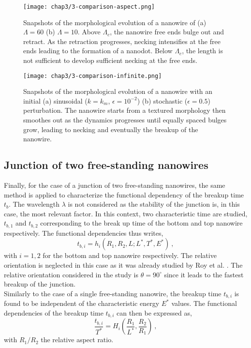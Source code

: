 \begin{figure}[H]
    \centering
    \texttt{[image: chap3/3-comparison-aspect.png]}
    \caption{Snapshots of the morphological evolution of a nanowire of (a) $\Lambda=60$ (b) $\Lambda=10$. Above $\Lambda_c$, the nanowire free ends bulge out and retract. As the retraction progresses, necking intensifies at the free ends leading to the formation of a nanodot. Below $\Lambda_c$, the length is not sufficient to develop sufficient necking at the free ends.}
    \label{fig:3-morph-evolution-aspect}
\end{figure}

\begin{figure}[H]
    \centering
    \texttt{[image: chap3/3-comparison-infinite.png]}
    \caption{Snapshots of the morphological evolution of a nanowire with an initial (a) sinusoidal ($k=k_m$, $\epsilon=10^{-2}$) (b) stochastic ($\epsilon=0.5$) perturbation. The nanowire starts from a textured morphology then smoothes out as the dynamics progresses until equally spaced bulges grow, leading to necking and eventually the breakup of the nanowire.}
    \label{fig:3-morph-evolution-infty}
\end{figure}

\subsection{Junction of two free-standing nanowires}
Finally, for the case of a junction of two free-standing nanowires, the same method is applied to characterize the functional dependency of the breakup time $t_b$. The wavelength $\lambda$ is not considered as the stability of the junction is, in this case, the most relevant factor. In this context, two characteristic time are studied, $t_{b,1}$ and $t_{b,2}$ corresponding to the break up time of the bottom and top nanowire respectively. The functional dependencies thus writes,
\begin{equation}
    t_{b,i} = h_i(R_1, R_2, L; L^*, T^*, E^*)\ ,
\end{equation}
with $i=1, 2$ for the bottom and top nanowire respectively. The relative orientation is neglected in this case as it was already studied by Roy et al. \cite{RoyVarmaGururajan2021}. The relative orientation considered in the study is $\theta=90^\circ$ since it leads to the fastest breakup of the junction.\\
Similarly to the case of a single free-standing nanowire, the breakup time $t_{b,i}$ is found to be independent of the characteristic energy $E^*$ values. The functional dependencies of the breakup time $t_{b,i}$ can then be expressed as,
\begin{equation}
    \frac{t_{b,i}}{T^*} = H_i\left(\frac{R_1}{L^*}, \frac{R_2}{R_1}\right)\ ,
\end{equation}
with $R_1/R_2$ the relative aspect ratio.

